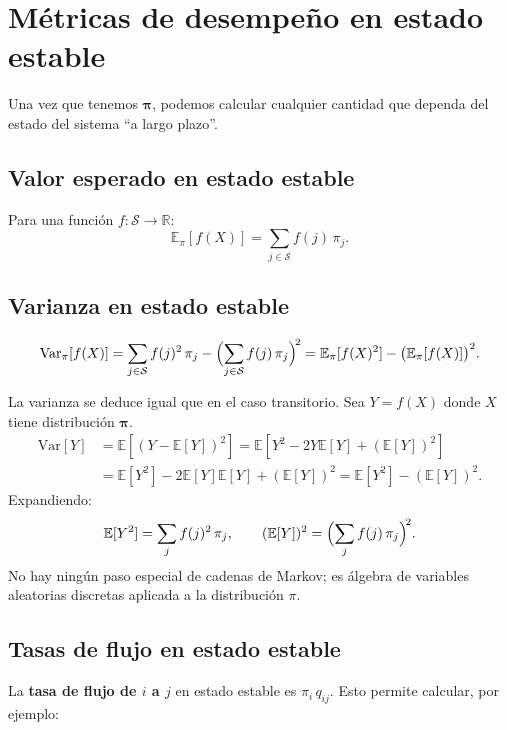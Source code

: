 \documentclass[11pt,a4paper]{article}
\theoremstyle{definition}
\theoremstyle{remark}
\newcommand{\R}{\mathbb{R}}
\newcommand{\E}{\mathbb{E}}
\newcommand{\Var}{\mathrm{Var}}
\begin{document}
\section{Métricas de desempeño en estado estable}

Una vez que tenemos $\boldsymbol{\pi}$, podemos calcular cualquier
cantidad que dependa del estado del sistema ``a largo plazo''.

\subsection{Valor esperado en estado estable}

Para una función $f:\mathcal{S}\to\R$:
\[
  \E_\pi[f(X)] = \sum_{j\in\mathcal{S}} f(j)\,\pi_j.
\]

\subsection{Varianza en estado estable}

\[
  \Var_\pi[f(X)] = \sum_{j\in\mathcal{S}} f(j)^2\,\pi_j
  - \Bigl(\sum_{j\in\mathcal{S}} f(j)\,\pi_j\Bigr)^{\!2}
  = \E_\pi[f(X)^2] - \bigl(\E_\pi[f(X)]\bigr)^2.
\]

\begin{cajanota}
La varianza se deduce igual que en el caso transitorio.  Sea
$Y = f(X)$ donde $X$ tiene distribución $\boldsymbol{\pi}$.
\begin{align*}
  \Var[Y] &= \E[(Y-\E[Y])^2] = \E[Y^2 - 2Y\E[Y] + (\E[Y])^2] \\
  &= \E[Y^2] - 2\E[Y]\E[Y] + (\E[Y])^2 = \E[Y^2] - (\E[Y])^2.
\end{align*}
Expandiendo:
\[
  \E[Y^2] = \sum_j f(j)^2\,\pi_j, \qquad
  (\E[Y])^2 = \Bigl(\sum_j f(j)\,\pi_j\Bigr)^{\!2}.
\]
No hay ningún paso especial de cadenas de Markov; es álgebra de
variables aleatorias discretas aplicada a la distribución $\pi$.
\end{cajanota}

\subsection{Tasas de flujo en estado estable}

La \textbf{tasa de flujo de $i$ a $j$} en estado estable es
$\pi_i\,q_{ij}$.  Esto permite calcular, por ejemplo:
\end{document}

